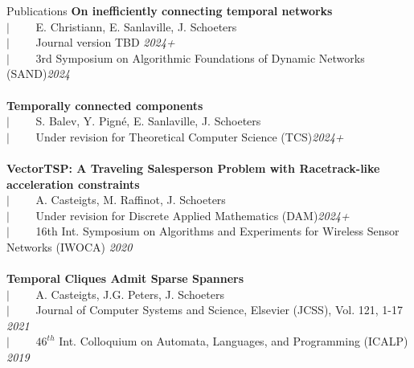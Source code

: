 \documentclass[french]{resume} %
\begin{document}
	\begin{rSection}{Publications }
		{\bf On inefficiently connecting temporal networks}\\
		$| \qquad$ E. Christiann, E. Sanlaville, J. Schoeters\\
		$| \qquad$ Journal version TBD \hfill {\em 2024+}\\
		$| \qquad$ 3rd Symposium on Algorithmic Foundations of Dynamic Networks (SAND)\hfill {\em 2024}
		\\
		\\
		{\bf Temporally connected components}\\
		$| \qquad$ S. Balev, Y. Pigné, E. Sanlaville, J. Schoeters\\
		$| \qquad$ Under revision for Theoretical Computer Science (TCS)\hfill {\em 2024+}
		\\
		\\
		{\bf VectorTSP: A Traveling Salesperson Problem with Racetrack-like acceleration constraints}\\
		$| \qquad$ A. Casteigts, M. Raffinot, J. Schoeters\\
		$| \qquad$ Under revision for Discrete Applied Mathematics (DAM)\hfill {\em 2024+}\\
		$| \qquad$ {\small 16th Int. Symposium on Algorithms and Experiments for Wireless Sensor Networks (IWOCA)} \hfill {\em 2020}
		\\
		\\
		{\bf Temporal Cliques Admit Sparse Spanners}\\
		$| \qquad$ A. Casteigts, J.G. Peters, J. Schoeters\\
		$| \qquad$ Journal of Computer Systems and Science, Elsevier (JCSS), Vol. 121, 1-17 \hfill {\em 2021}\\
		$| \qquad$ $46^{th}$ Int. Colloquium on Automata, Languages, and Programming (ICALP) \hfill {\em 2019}
	\end{rSection}
	
\end{document}
